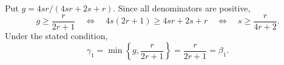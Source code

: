 Put \(g=4sr/(4sr+2s+r)\).  Since all denominators are positive,
\[
g\geq\frac{r}{2r+1}
\quad\Longleftrightarrow\quad
4s(2r+1)\geq4sr+2s+r
\quad\Longleftrightarrow\quad
s\geq\frac{r}{4r+2}.
\]
Under the stated condition,
\[
\gamma_1=\min\left\{g,\frac{r}{2r+1}\right\}
=\frac{r}{2r+1}=\beta_1.
\]